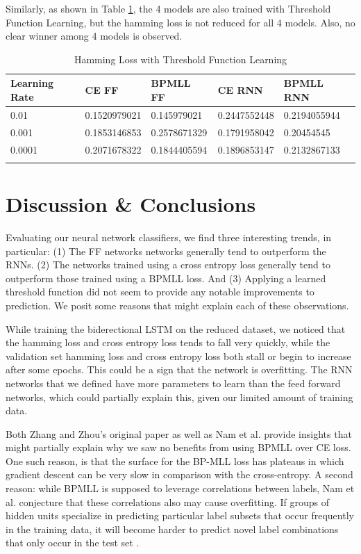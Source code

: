 \documentclass[11pt]{article}
\begin{document}
Similarly, as shown in Table \ref{PVFTT}, the 4 models are also trained with Threshold Function Learning, but the hamming loss is not reduced for all 4 models. Also, no clear winner among 4 models is observed. 
\newpage
 \begin{longtable}[c]{| p{} | p{} |p{} |p{} |p{} |}
\hline
        Learning Rate  & CE FF & BPMLL FF &CE RNN &BPMLL RNN  \\
        \hline
         0.01 & 0.1520979021 & 0.145979021 & 0.2447552448 & 0.2194055944\\
        \hline
         0.001 & 0.1853146853 & 0.2578671329 & 0.1791958042 & 0.20454545\\
        \hline
         0.0001 & 0.2071678322 & 0.1844405594 & 0.1896853147 & 0.2132867133\\
        \hline        
\caption{Hamming Loss with Threshold Function Learning}
\label{PVFTT}
\end{longtable}

\section{Discussion \& Conclusions}

Evaluating our neural network classifiers, we find three interesting trends, in particular: (1) The FF networks networks generally tend to outperform the RNNs. (2) The networks trained using a cross entropy loss generally tend to outperform those trained using a BPMLL loss. And (3) Applying a learned threshold function did not seem to provide any notable improvements to prediction. We posit some reasons that might explain each of these observations.

While training the biderectional LSTM on the reduced dataset, we noticed that the hamming loss and cross entropy loss tends to fall very quickly, while the validation set hamming loss and cross entropy loss both stall or begin to increase after some epochs. This could be a sign that the network is overfitting. The RNN networks that we defined have more parameters to learn than the feed forward networks, which could partially explain this, given our limited amount of training data. 

Both Zhang and Zhou's original paper as well as Nam et al. \autocite{bp_mll_revisited} provide insights that might partially explain why we saw no benefits from using BPMLL over CE loss. One such reason, is that the surface for the BP-MLL loss has plateaus in which gradient descent can be very slow in comparison with the cross-entropy. A second reason: while BPMLL is supposed to leverage correlations between labels, Nam et al. conjecture that these correlations also may cause overfitting. If groups of hidden units specialize in predicting particular label subsets that occur frequently in the training data, it will become harder to predict novel label combinations that only occur in the test set \autocite{bp_mll_revisited}. 
\end{document}
